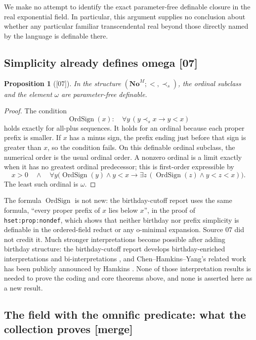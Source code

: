 \documentclass[11pt,a4paper]{article}
\numberwithin{equation}{section}
\newtheorem{proposition}[proposition]{Proposition}
\theoremstyle{definition}
\theoremstyle{remark}
\newcommand{\No}{\mathbf{No}}
\newcommand{\ps}{\mathrel{\prec_s}}
\newcommand{\src}[1]{\textup{\textsf{\small[#1]}}}
\newcommand{\mergetag}{\textup{\textsf{\small[merge]}}}
\newcommand{\lbl}[1]{\nolinkurl{#1}}
\begin{document}
We make no attempt to identify the exact parameter-free definable closure
in the real exponential field. In particular, this argument supplies no
conclusion about whether any particular familiar transcendental real
beyond those directly named by the language is definable there.

\subsection{Simplicity already defines omega \src{07}}

\begin{proposition}[\src{07}]\label{dsn:prop:simplicity-omega}
In the structure $(\No^M;<,\ps)$, the ordinal subclass and the element
$\omega$ are parameter-free definable.
\end{proposition}
\begin{proof}
The condition
\[
 \operatorname{OrdSign}(x):\quad
 \forall y\,(y\ps x\longrightarrow y<x)
\]
holds exactly for all-plus sequences. It holds for an ordinal because each
proper prefix is smaller. If $x$ has a minus sign, the prefix ending just
before that sign is greater than $x$, so the condition fails. On this
definable ordinal subclass, the numerical order is the usual ordinal order.
A nonzero ordinal is a limit exactly when it has no greatest ordinal
predecessor; this is first-order expressible by
\[
 x>0\quad\wedge\quad
 \forall y\bigl(\operatorname{OrdSign}(y)\wedge y<x
 \longrightarrow
 \exists z\, (\operatorname{OrdSign}(z)\wedge y<z<x)\bigr).
\]
The least such ordinal is $\omega$.
\end{proof}

The formula $\operatorname{OrdSign}$ is not new: the birthday-cutoff report
uses the same formula, ``every proper prefix of $x$ lies below $x$'', in
the proof of \lbl{hset:prop:nondef}, which shows that neither birthday nor
prefix simplicity is definable in the ordered-field reduct or any o-minimal
expansion. Source 07 did not credit it. Much stronger interpretations
become possible after adding birthday structure: the birthday-cutoff report
develops birthday-enriched interpretations and bi-interpretations
\cite{RepoHset}, and Chen--Hamkins--Yang's related work has been publicly
announced by Hamkins \cite{CHY}. None of those interpretation results is
needed to prove the coding and core theorems above, and none is asserted
here as a new result.

\subsection{The field with the omnific predicate: what the collection proves \mergetag}
\end{document}
